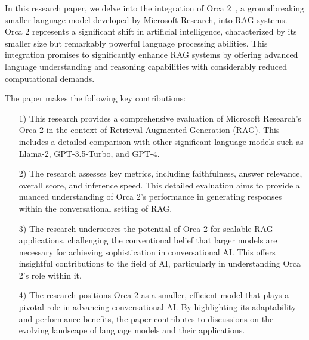 \documentclass[runningheads]{llncs}
\begin{document}
In this research paper, we delve into the integration of Orca 2~\cite{mitra2023orca}, a groundbreaking smaller language model developed by Microsoft Research, into RAG systems. Orca 2 represents a significant shift in artificial intelligence, characterized by its smaller size but remarkably powerful language processing abilities. This integration promises to significantly enhance RAG systems by offering advanced language understanding and reasoning capabilities with considerably reduced computational demands.

The paper makes the following key contributions:
\begin{enumerate}
     \item[1)] This research provides a comprehensive evaluation of Microsoft Research's Orca 2 in the context of Retrieval Augmented Generation (RAG). This includes a detailed comparison with other significant language models such as Llama-2, GPT-3.5-Turbo, and GPT-4.    
     
    \item[2)] The research assesses key metrics, including faithfulness, answer relevance, overall score, and inference speed. This detailed evaluation aims to provide a nuanced understanding of Orca 2's performance in generating responses within the conversational setting of RAG.
    
    \item[3)] The research underscores the potential of Orca 2 for scalable RAG applications, challenging the conventional belief that larger models are necessary for achieving sophistication in conversational AI. This offers insightful contributions to the field of AI, particularly in understanding Orca 2's role within it.

    \item[4)] The research  positions Orca 2  as a smaller, efficient model that plays a pivotal role in advancing conversational AI. By highlighting its adaptability and performance benefits, the paper contributes to discussions on the evolving landscape of language models and their applications. 
\end{enumerate}
 
\end{document}
